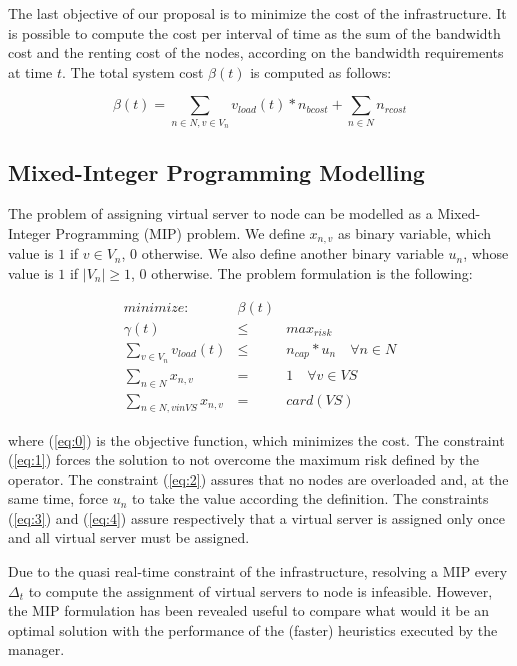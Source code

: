 \documentclass[final,10pt,a5paper]{phdimt}
\theoremstyle{definition}
\begin{document}
The last objective of our proposal is to  minimize the cost of the infrastructure. It is possible to compute the cost per interval of time as the sum of the bandwidth cost and the renting cost of the nodes, according on the bandwidth requirements at time $t$. The total system cost $\beta(t)$ is computed as follows:

\begin{equation}
\beta(t) = \sum_{n \in N, v \in V_n} v_{load}(t) * n_{bcost} + \sum_{n \in N} n_{rcost}
\end{equation}



\subsection{Mixed-Integer Programming Modelling}

The problem of assigning virtual server to node can be modelled as a Mixed-Integer Programming (MIP) problem. We define $x_{n,v}$ as binary variable, which value is $1$ if $v \in V_n$, $0$ otherwise. We also define another binary variable $u_n$, whose value is $1$ if $|V_n| \geq 1$, $0$ otherwise. The problem formulation is the following:


\begin{eqnarray}
minimize : & \beta(t) \label{eq:0}\\
\gamma(t) & \leq & max_{risk} \label{eq:1}\\
\sum_{v \in V_n} v_{load}(t) & \leq & n_{cap} * u_n \quad \forall n  \in N \label{eq:2} \\
\sum_{n \in N} x_{n,v} & = & 1 \quad \forall v \in VS \label{eq:3}\\
\sum_{n \in N, v in VS} x_{n,v} & = & card(VS) \label{eq:4}
\end{eqnarray} 

where (\ref{eq:0}) is the objective function, which minimizes the cost.
The constraint (\ref{eq:1}) forces the solution to not overcome the maximum risk defined by the operator.
The constraint (\ref{eq:2}) assures that no nodes are overloaded and, at the same time, force $u_n$ to take the value according the definition.
The constraints (\ref{eq:3}) and (\ref{eq:4}) assure respectively that a virtual server is assigned only once and all virtual server must be assigned.

Due to the quasi real-time constraint of the infrastructure, resolving a MIP every $\Delta_t$ to compute the assignment of virtual servers to node is infeasible. However, the MIP formulation has been revealed useful to compare what would it be an optimal solution with the 
performance of the (faster) heuristics executed by the manager.
\end{document}
